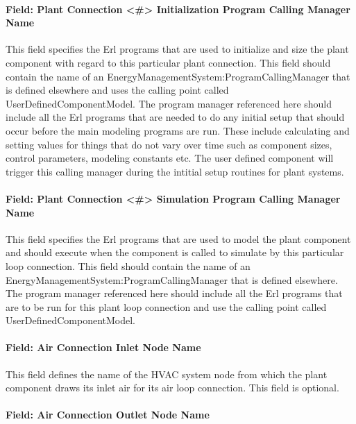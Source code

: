 \paragraph{Field: Plant Connection \textless{}\#\textgreater{} Initialization Program Calling Manager Name}\label{field-plant-connection-x-initialization-program-calling-manager-name}

This field specifies the Erl programs that are used to initialize and size the plant component with regard to this particular plant connection. This field should contain the name of an EnergyManagementSystem:ProgramCallingManager that is defined elsewhere and uses the calling point called UserDefinedComponentModel. The program manager referenced here should include all the Erl programs that are needed to do any initial setup that should occur before the main modeling programs are run. These include calculating and setting values for things that do not vary over time such as component sizes, control parameters, modeling constants etc. The user defined component will trigger this calling manager during the intitial setup routines for plant systems.

\paragraph{Field: Plant Connection \textless{}\#\textgreater{} Simulation Program Calling Manager Name}\label{field-plant-connection-x-simulation-program-calling-manager-name}

This field specifies the Erl programs that are used to model the plant component and should execute when the component is called to simulate by this particular loop connection. This field should contain the name of an EnergyManagementSystem:ProgramCallingManager that is defined elsewhere. The program manager referenced here should include all the Erl programs that are to be run for this plant loop connection and use the calling point called UserDefinedComponentModel.

\paragraph{Field: Air Connection Inlet Node Name}\label{field-air-connection-inlet-node-name}

This field defines the name of the HVAC system node from which the plant component draws its inlet air for its air loop connection. This field is optional.

\paragraph{Field: Air Connection Outlet Node Name}\label{field-air-connection-outlet-node-name}

